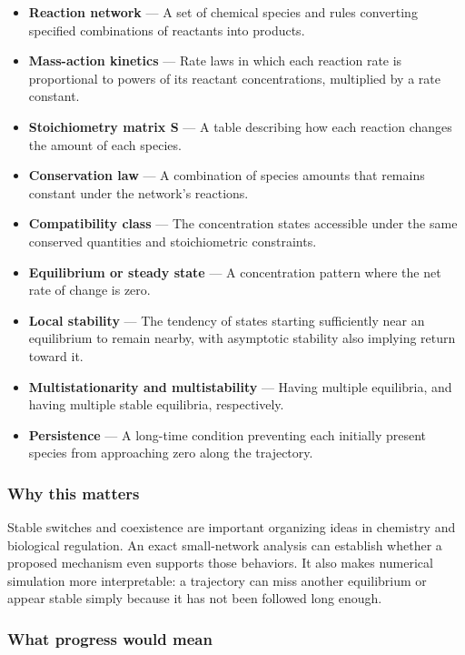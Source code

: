 \documentclass[
  11pt,
]{article}
\begin{document}
\begin{itemize}
\item
  \textbf{Reaction network} --- A set of chemical species and rules
  converting specified combinations of reactants into products.
\item
  \textbf{Mass-action kinetics} --- Rate laws in which each reaction
  rate is proportional to powers of its reactant concentrations,
  multiplied by a rate constant.
\item
  \textbf{Stoichiometry matrix S} --- A table describing how each
  reaction changes the amount of each species.
\item
  \textbf{Conservation law} --- A combination of species amounts that
  remains constant under the network's reactions.
\item
  \textbf{Compatibility class} --- The concentration states accessible
  under the same conserved quantities and stoichiometric constraints.
\item
  \textbf{Equilibrium or steady state} --- A concentration pattern where
  the net rate of change is zero.
\item
  \textbf{Local stability} --- The tendency of states starting
  sufficiently near an equilibrium to remain nearby, with asymptotic
  stability also implying return toward it.
\item
  \textbf{Multistationarity and multistability} --- Having multiple
  equilibria, and having multiple stable equilibria, respectively.
\item
  \textbf{Persistence} --- A long-time condition preventing each
  initially present species from approaching zero along the trajectory.
\end{itemize}

\subsubsection{Why this matters}

Stable switches and coexistence are important organizing ideas in
chemistry and biological regulation. An exact small-network analysis can
establish whether a proposed mechanism even supports those behaviors. It
also makes numerical simulation more interpretable: a trajectory can
miss another equilibrium or appear stable simply because it has not been
followed long enough.

\subsubsection{What progress would mean}
\end{document}
